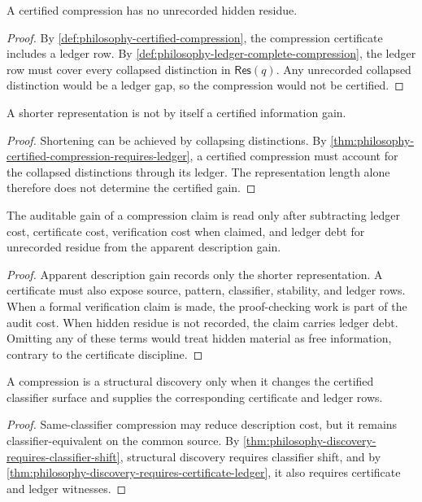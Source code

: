 \begin{theorem}
\label{thm:philosophy-certified-compression-requires-ledger}
A certified compression has no unrecorded hidden residue.
\end{theorem}
\begin{proof}
By \autoref{def:philosophy-certified-compression}, the compression
certificate includes a ledger row. By
\autoref{def:philosophy-ledger-complete-compression}, the ledger row must
cover every collapsed distinction in $\mathsf{Res}(q)$. Any unrecorded
collapsed distinction would be a ledger gap, so the compression would not
be certified.
\end{proof}

\begin{corollary}
\label{cor:philosophy-shorter-presentation-not-certified-gain}
A shorter representation is not by itself a certified information gain.
\end{corollary}
\begin{proof}
Shortening can be achieved by collapsing distinctions. By
\autoref{thm:philosophy-certified-compression-requires-ledger}, a
certified compression must account for the collapsed distinctions through
its ledger. The representation length alone therefore does not determine
the certified gain.
\end{proof}

\begin{theorem}
\label{thm:philosophy-information-conservation-compression}
The auditable gain of a compression claim is read only after subtracting
ledger cost, certificate cost, verification cost when claimed, and ledger
debt for unrecorded residue from the apparent description gain.
\end{theorem}
\begin{proof}
Apparent description gain records only the shorter representation. A
certificate must also expose source, pattern, classifier, stability, and
ledger rows. When a formal verification claim is made, the proof-checking
work is part of the audit cost. When hidden residue is not recorded, the
claim carries ledger debt. Omitting any of these terms would treat hidden
material as free information, contrary to the certificate discipline.
\end{proof}

\begin{corollary}
\label{cor:philosophy-compression-discovery-requires-classifier-shift}
A compression is a structural discovery only when it changes the
certified classifier surface and supplies the corresponding certificate
and ledger rows.
\end{corollary}
\begin{proof}
Same-classifier compression may reduce description cost, but it remains
classifier-equivalent on the common source. By
\autoref{thm:philosophy-discovery-requires-classifier-shift}, structural
discovery requires classifier shift, and by
\autoref{thm:philosophy-discovery-requires-certificate-ledger}, it also
requires certificate and ledger witnesses.
\end{proof}

